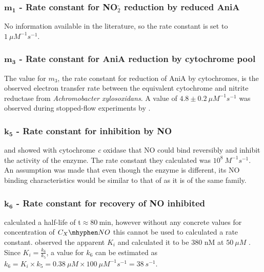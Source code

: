 \subsubsection*{$\mathbf{m_1}$ {\bf- Rate constant for NO$_{\textrm{2}}^{\textrm{-}}$ reduction by reduced AniA}}
No information available in the literature, so the rate constant is set to $1~\mu M^{-1}s^{-1}$.

\subsubsection*{$\mathbf{m_3}$ {\bf- Rate constant for AniA reduction by cytochrome pool}}
The value for $m_3$, the rate constant for reduction of AniA by cytochromes, is the observed electron transfer rate between the equivalent cytochrome and nitrite reductase from \textit{Achromobacter xylosoxidans}. A value of $4.8\pm0.2~\mu M^{-1}s^{-1}$ was observed during stopped-flow experiments by \citet{Nojiri2009}.

\subsubsection*{$\mathbf{k_5}$ {\bf- Rate constant for \cbbthree{} inhibition by NO}}
\citet{Giuffre2000} and \citet{Blackmore1991} showed with cytochrome \textit{c} oxidase that NO could bind reversibly and inhibit the activity of the enzyme. The rate constant they calculated was $10^8~M ^{-1} s ^{-1}$. An assumption was made that even though the enzyme is different, its NO binding characteristics would be similar to that of \cbbthree{} as it is of the same family.

\subsubsection*{$\mathbf{k_6}$ {\bf- Rate constant for recovery of NO inhibited \cbbthree{}}}
\citet{Giuffre2000} calculated a half-life of t\textonehalf $\approx 80~\mathrm{min}$, however without any concrete values for concentration of $C_X\mhyphen NO$ this cannot be used to calculated a rate constant.
\citet{Rock2005} observed the apparent $K_i$ and calculated it to be 380 nM at $50~\mu M$ \cOxygen{}. Since $K_i = \frac{k_6}{k_5}$, a value for $k_6$ can be estimated as $k_6 = K_i \times k_5 = 0.38~\mu M \times 100~\mu M^{-1}s^{-1} = 38~s^{-1}$.

